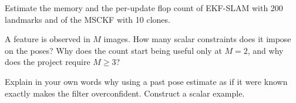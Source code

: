 \begin{exercises}
  \item Estimate the memory and the per-update flop count of EKF-SLAM with 200 landmarks and of the MSCKF with 10 clones.
  \item A feature is observed in $M$ images. How many scalar constraints does it impose on the poses? Why does the count
        start being useful only at $M = 2$, and why does the project require $M \ge 3$?
  \item Explain in your own words why using a past pose estimate as if it were known exactly makes the filter
        overconfident. Construct a scalar example.
\end{exercises}
